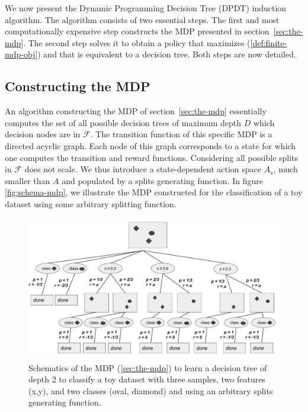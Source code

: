 We now present the Dynamic Programming Decision Tree (DPDT) induction algorithm. 
The algorithm consists of two essential steps. The first and most computationally expensive step constructs the MDP presented in section~\ref{sec:the-mdp}. 
The second step solves it to obtain a policy that maximizes (\ref{def:finite-mdp-obj}) and that is equivalent to a decision tree. Both steps are now detailed.

\subsection{Constructing the MDP}

An algorithm constructing the MDP of section~\ref{sec:the-mdp} essentially computes the set of all possible decision trees of maximum depth $D$ which decision nodes are in $\mathcal F$. 
The transition function of this specific MDP is a directed acyclic graph. Each node of this graph corresponds to a state for which one computes the transition and reward functions. 
Considering all possible splits in $\mathcal F$ does not scale.
We thus introduce a state-dependent action space $A_s$, much smaller than $A$ and populated by a splits generating function. In figure \ref{fig:schema-mdp}, we illustrate the MDP constructed for the classification of a toy dataset using some arbitrary splitting function.

\begin{figure}
      \centering
      \includegraphics[width=0.9\linewidth]{images/figures/schema_mdp.pdf}
      \caption{Schematics of the MDP (\ref{sec:the-mdp}) to learn a decision tree of depth 2 to classify a toy dataset with three samples, two features (x,y), and two classes (oval, diamond) and using an arbitrary splits generating function.}
      \end{figure}

